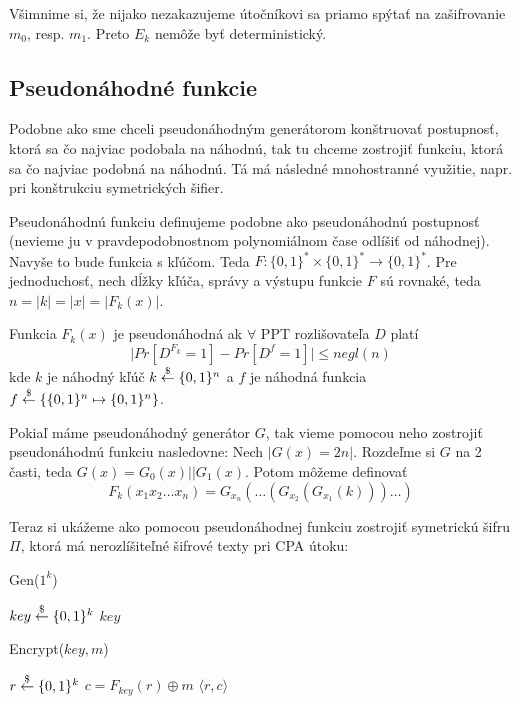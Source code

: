 Všimnime si, že nijako nezakazujeme útočníkovi sa priamo spýtať na zašifrovanie $m_0$, resp. $m_1$. 
Preto $E_k$ nemôže byť deterministický. 

\subsection{Pseudonáhodné funkcie}

Podobne ako sme chceli pseudonáhodným generátorom konštruovať
postupnosť, ktorá sa čo najviac podobala na náhodnú, tak tu
chceme zostrojiť funkciu, ktorá sa čo najviac podobná na náhodnú. 
Tá má následné mnohostranné využitie, napr. pri konštrukciu symetrických šifier.

Pseudonáhodnú funkciu definujeme podobne ako pseudonáhodnú postupnosť 
(nevieme ju v pravdepodobnostnom polynomiálnom čase odlíšiť od náhodnej). 
Navyše to bude funkcia s kľúčom. 
Teda $F: \{0,1\}^* \times \{0,1\}^* \to \{0,1\}^*$. 
Pre jednoduchosť, nech dĺžky
kľúča, správy a výstupu funkcie $F$ sú rovnaké, teda $n = |k| = |x| = |F_k(x)|$.

\begin{definicia}
    Funkcia $F_k(x)$ je pseudonáhodná ak $\forall$ PPT rozlišovateľa 
        $D$ platí
    \begin{equation*}
        \Big| Pr[D^{F_k} = 1] - Pr[D^f = 1] \Big| \leq negl(n)
    \end{equation*}
    kde $k$ je náhodný kľúč $k \overset{\$}{\leftarrow} \{0,1\}^n$ a 
    $f$ je náhodná funkcia $f \overset{\$}{\leftarrow} \{ \{0,1\}^n \mapsto \{0,1\}^n\}$.
\end{definicia}

Pokiaľ máme pseudonáhodný generátor $G$,
tak vieme pomocou neho zostrojiť pseudonáhodnú funkciu nasledovne:
Nech $|G(x)=2n|$. Rozdeľme si $G$ na 2 časti, teda $G(x) = G_0(x)||G_1(x)$.
Potom môžeme definovať
\begin{equation*}
    F_k(x_1 x_2 \dots x_n) = G_{x_n}(\dots(G_{x_2}(G_{x_1}(k)))\dots)
\end{equation*}

Teraz si ukážeme ako pomocou pseudonáhodnej funkciu zostrojiť symetrickú šifru $\Pi$, ktorá má nerozlíšiteľné
šifrové texty pri CPA útoku:

\begin{procedure}[h!]
    \caption{Gen($1^k$)}
    $key \overset{\$}{\leftarrow} \{0,1\}^k$\;
    \Return $key$\;
\end{procedure}

\begin{procedure}[h!]
    \caption{Encrypt($key,m$)}
    $r \overset{\$}{\leftarrow} \{0,1\}^k$\;
    $c = F_{key}(r) \oplus m$\;
    \Return $\langle r,c \rangle$\;
\end{procedure}

